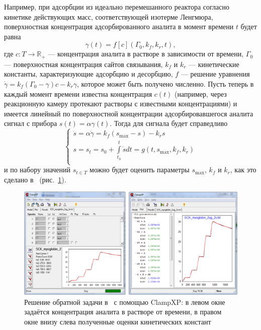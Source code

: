 \documentclass[oneside,final,12pt]{extreport}
\begin{document}
Например, при адсорбции из идеально перемешанного реактора
согласно кинетике действующих масс, соответствующей изотерме Ленгмюра,
поверхностная концентрация адсорбированного аналита
в момент времени $t$ будет равна
\begin{equation}
  \gamma\left(t\right) = f\left[c\right]\left(\Gamma_0, k_f, k_r, t\right),
\end{equation}
где $c:T\rightarrow\mathbb{R}_+$ --- концентрация аналита в растворе в зависимости от времени,
$\Gamma_0$ --- поверхностная концентрация сайтов связывания,
$k_f$ и $k_r$ --- кинетические константы, характеризующие адсорбцию и десорбцию,
$f$ --- решение уравнения
$\dot{\gamma} = k_f \left(\Gamma_0-\gamma\right) c - k_r \gamma$,
которое может быть получено численно.
Пусть теперь в каждый момент времени известна концентрация $c\left(t\right)$
(например, через реакционную камеру протекают растворы с известными концентрациями)
и имеется линейный по поверхностной концентрации адсорбировавшегося аналита
сигнал с прибора $s\left(t\right) = \alpha\gamma\left(t\right)$.
Тогда для сигнала будет справедливо
\begin{equation}
\begin{cases}
  \dot{s} = \alpha\dot{\gamma} = k_f \left(s_{\max} - s\right) - k_r s \\
  s = s_t = s_0 + \int\limits_{t_0}^{t} \dot{s} dt = g(t, s_{\max}, k_f, k_r) \\
\end{cases}
\end{equation}
и по набору значений $s_{t \in T}$ можно будет оценить параметры
$s_{\max}$, $k_f$ и $k_r$,
как это сделано в~\cite{bib:FULLTEXT_inverse_example} (рис.~\ref{fig:FULLTEXT_inverse_example}).

\begin{figure}
  \centering
  \includegraphics[width=.8\textwidth]{pic/FULLTEXT_inverse_example}
  \caption{\label{fig:FULLTEXT_inverse_example}%
    Решение обратной задачи в~\cite{bib:FULLTEXT_inverse_example}
    с помощью ClampXP:
    в левом окне задаётся концентрация аналита в растворе от времени,
    в правом окне внизу слева полученные оценки кинетических констант
  }

\end{figure}
\end{document}
